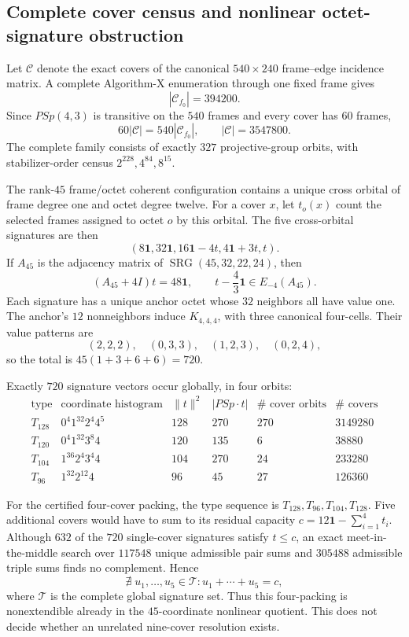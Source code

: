 \subsection{Complete cover census and nonlinear octet-signature obstruction}
\label{sec:complete-cover-signature}

Let $\mathcal C$ denote the exact covers of the canonical $540\times240$
frame--edge incidence matrix.  A complete Algorithm-X enumeration through one
fixed frame gives
\[
 |\mathcal C_{f_0}|=394200.
\]
Since $PSp(4,3)$ is transitive on the $540$ frames and every cover has $60$
frames,
\[
 60|\mathcal C|=540|\mathcal C_{f_0}|,
 \qquad
 \boxed{|\mathcal C|=3547800}.
\]
The complete family consists of exactly $327$ projective-group orbits, with
stabilizer-order census $2^{228},4^{84},8^{15}$.

The rank-$45$ frame/octet coherent configuration contains a unique cross
orbital of frame degree one and octet degree twelve.  For a cover $x$, let
$t_o(x)$ count the selected frames assigned to octet $o$ by this orbital.  The
five cross-orbital signatures are then
\[
 \boxed{(8\mathbf1,32\mathbf1,16\mathbf1-4t,4\mathbf1+3t,t)}.
\]
If $A_{45}$ is the adjacency matrix of $\operatorname{SRG}(45,32,22,24)$,
then
\[
 (A_{45}+4I)t=48\mathbf1,
 \qquad
 t-\frac43\mathbf1\in E_{-4}(A_{45}).
\]
Each signature has a unique anchor octet whose $32$ neighbors all have value
one.  The anchor's $12$ nonneighbors induce $K_{4,4,4}$, with three canonical
four-cells.  Their value patterns are
\[
(2,2,2),\quad(0,3,3),\quad(1,2,3),\quad(0,2,4),
\]
so the total is $45(1+3+6+6)=720$.

Exactly $720$ signature vectors occur globally, in four orbits:
\[
\begin{array}{c|c|c|c|c|c}
\text{type}&\text{coordinate histogram}&\|t\|^2&|PSp\cdot t|&
\#\text{ cover orbits}&\#\text{ covers}\\ \hline
T_{128}&0^4 1^{32}2^4 4^5&128&270&270&3149280\\
T_{120}&0^4 1^{32}3^8 4&120&135&6&38880\\
T_{104}&1^{36}2^4 3^4 4&104&270&24&233280\\
T_{96}&1^{32}2^{12}4&96&45&27&126360
\end{array}
\]

For the certified four-cover packing, the type sequence is
$T_{128},T_{96},T_{104},T_{128}$.  Five additional covers would have to sum to
its residual capacity $c=12\mathbf1-\sum_{i=1}^4t_i$.  Although $632$ of the
$720$ single-cover signatures satisfy $t\leq c$, an exact meet-in-the-middle
search over $117548$ unique admissible pair sums and $305488$ admissible triple
sums finds no complement.  Hence
\[
 \boxed{\nexists\;u_1,\ldots,u_5\in\mathcal T:
 u_1+\cdots+u_5=c},
\]
where $\mathcal T$ is the complete global signature set.  Thus this four-packing
is nonextendible already in the $45$-coordinate nonlinear quotient.  This does
not decide whether an unrelated nine-cover resolution exists.
